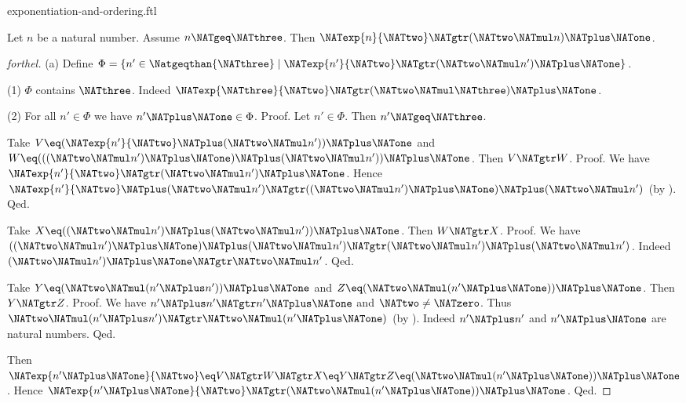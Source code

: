 \documentclass{naproche-library}
\begin{document}
\begin{smodule}[title=Exponentiation and Ordering]{exponentiation-and-ordering.ftl}
\begin{proposition}[forthel,id=ARITHMETIC_09_134060414337024]
  Let $n$ be a natural number.
  Assume $n \NATgeq \NATthree$.
  Then $\NATexp{n}{\NATtwo} \NATgtr (\NATtwo \NATmul n) \NATplus \NATone$.
\end{proposition}
\begin{proof}[forthel]
  (a) Define $\Phi = \{ n' \in \Natgeqthan{\NATthree} \mid \NATexp{n'}{\NATtwo} \NATgtr (\NATtwo \NATmul n') \NATplus \NATone \}$.

  (1) $\Phi$ contains $\NATthree$.
  Indeed $\NATexp{\NATthree}{\NATtwo} \NATgtr (\NATtwo \NATmul \NATthree) \NATplus \NATone$.

  (2) For all $n' \in \Phi$ we have $n' \NATplus \NATone \in \Phi$. \newline
  Proof.
    Let $n' \in \Phi$.
    Then $n' \NATgeq \NATthree$.

    Take $V \eq (\NATexp{n'}{\NATtwo} \NATplus (\NATtwo \NATmul n')) \NATplus \NATone$ and $W \eq (((\NATtwo \NATmul n') \NATplus \NATone) \NATplus (\NATtwo \NATmul n')) \NATplus \NATone$.
    Then $V \NATgtr W$. \newline
    Proof.
      We have $\NATexp{n'}{\NATtwo} \NATgtr (\NATtwo \NATmul n') \NATplus \NATone$.
      Hence $\NATexp{n'}{\NATtwo} \NATplus (\NATtwo \NATmul n') \NATgtr ((\NATtwo \NATmul n') \NATplus \NATone) \NATplus (\NATtwo \NATmul n')$ (by ).
    Qed.

    Take $X \eq ((\NATtwo \NATmul n') \NATplus (\NATtwo \NATmul n')) \NATplus \NATone$.
    Then $W \NATgtr X$. \newline
    Proof.
      We have $((\NATtwo \NATmul n') \NATplus \NATone) \NATplus (\NATtwo \NATmul n') \NATgtr (\NATtwo \NATmul n') \NATplus (\NATtwo \NATmul n')$.
      Indeed $(\NATtwo \NATmul n') \NATplus \NATone \NATgtr \NATtwo \NATmul n'$.
    Qed.

    Take $Y \eq (\NATtwo \NATmul (n' \NATplus n')) \NATplus \NATone$ and $Z \eq (\NATtwo \NATmul (n' \NATplus \NATone)) \NATplus \NATone$.
    Then $Y \NATgtr Z$. \newline
    Proof.
      We have $n' \NATplus n' \NATgtr n' \NATplus \NATone$ and $\NATtwo \neq \NATzero$.
      Thus $\NATtwo \NATmul (n' \NATplus n') \NATgtr \NATtwo \NATmul (n' \NATplus \NATone)$ (by ).
      Indeed $n' \NATplus n'$ and $n' \NATplus \NATone$ are natural numbers.
    Qed.

    Then $\NATexp{n' \NATplus \NATone}{\NATtwo} \eq V \NATgtr W \NATgtr X \eq Y \NATgtr Z \eq (\NATtwo \NATmul (n' \NATplus \NATone)) \NATplus \NATone$.
    Hence $\NATexp{n' \NATplus \NATone}{\NATtwo} \NATgtr (\NATtwo \NATmul (n' \NATplus \NATone)) \NATplus \NATone$.
  Qed.


\end{proof}
\end{smodule}
\end{document}
